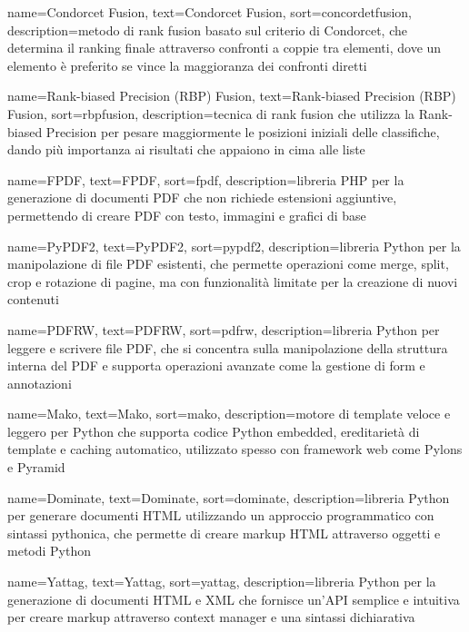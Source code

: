  {
    name=Condorcet Fusion,
    text=Condorcet Fusion,
    sort=concordetfusion,
    description={metodo di rank fusion basato sul criterio di Condorcet, che determina il ranking finale attraverso confronti a coppie tra elementi, dove un elemento è preferito se vince la maggioranza dei confronti diretti}
}

 {
    name=Rank-biased Precision (RBP) Fusion,
    text=Rank-biased Precision (RBP) Fusion,
    sort=rbpfusion,
    description={tecnica di rank fusion che utilizza la Rank-biased Precision per pesare maggiormente le posizioni iniziali delle classifiche, dando più importanza ai risultati che appaiono in cima alle liste}
}

 {
    name=FPDF,
    text=FPDF,
    sort=fpdf,
    description={libreria PHP per la generazione di documenti PDF che non richiede estensioni aggiuntive, permettendo di creare PDF con testo, immagini e grafici di base}
}

 {
    name=PyPDF2,
    text=PyPDF2,
    sort=pypdf2,
    description={libreria Python per la manipolazione di file PDF esistenti, che permette operazioni come merge, split, crop e rotazione di pagine, ma con funzionalità limitate per la creazione di nuovi contenuti}
}

 {
    name=PDFRW,
    text=PDFRW,
    sort=pdfrw,
    description={libreria Python per leggere e scrivere file PDF, che si concentra sulla manipolazione della struttura interna del PDF e supporta operazioni avanzate come la gestione di form e annotazioni}
}

 {
    name=Mako,
    text=Mako,
    sort=mako,
    description={motore di template veloce e leggero per Python che supporta codice Python embedded, ereditarietà di template e caching automatico, utilizzato spesso con framework web come Pylons e Pyramid}
}

 {
    name=Dominate,
    text=Dominate,
    sort=dominate,
    description={libreria Python per generare documenti HTML utilizzando un approccio programmatico con sintassi pythonica, che permette di creare markup HTML attraverso oggetti e metodi Python}
}

 {
    name=Yattag,
    text=Yattag,
    sort=yattag,
    description={libreria Python per la generazione di documenti HTML e XML che fornisce un'API semplice e intuitiva per creare markup attraverso context manager e una sintassi dichiarativa}
}

